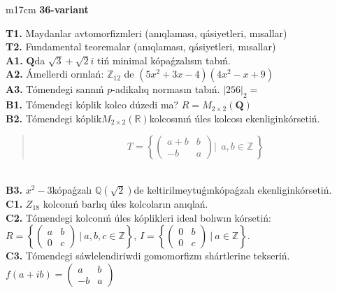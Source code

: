 \documentclass{article}
\begin{document}
\begin{tabular}{m{17cm}}
\textbf{36-variant}
\newline

\textbf{T1.} Maydanlar avtomorfizmleri (anıqlaması, qásiyetleri, mısallar) \\
\textbf{T2.} Fundamental teoremalar (anıqlaması, qásiyetleri, mısallar) \\
\textbf{A1.} \(\mathbf{Q}\)da \(\sqrt{3} + \sqrt{2}i\) tiń minimal kópaǵzalısın tabıń. \\
\textbf{A2.} Ámellerdi orınlań: \(\mathbb{Z}_{12}\) de \(\left( 5x^{2} + 3x - 4 \right)\left( 4x^{2} - x + 9 \right)\) \\
\textbf{A3.} Tómendegi sannıń \(p\)-adikalıq normasın tabıń. \(|256|_{2} =\) \\
\textbf{B1.} Tómendegi kóplik kolco dúzedi ma? \(R = M_{2 \times 2}\left( \mathbf{Q} \right)\) \\
\textbf{B2.} Tómendegi kóplik\(M_{2 \times 2}\left( \mathbb{R} \right)\)kolcosınıń úles kolcosı ekenliginkórsetiń.
\begin{quote}
\[T = \left\{ \begin{pmatrix}
a + b & b \\
 - b & a
\end{pmatrix}\left| \ \ a,b\mathbb{\in Z} \right.\  \right\}\]
\end{quote} \\
\textbf{B3.} \(x^{2} - 3\)kópaǵzalı \(\mathbb{Q}(\sqrt{2})\)de keltirilmeytuǵınkópaǵzalı ekenliginkórsetiń. \\
\textbf{C1.} \(Z_{18}\) kolconıń barlıq úles kolcoların anıqlań. \\
\textbf{C2.} Tómendegi kolconıń úles kóplikleri ideal bolıwın kórsetiń:
\(R = \left\{ \begin{pmatrix}
a & b \\
0 & c
\end{pmatrix}\ |\ a,b,c \in \mathbb{Z} \right\}\), \(I = \left\{ \begin{pmatrix}
0 & b \\
0 & c
\end{pmatrix}\ |\ a \in \mathbb{Z} \right\}\). \\
\textbf{C3.} Tómendegi sáwlelendiriwdi gomomorfizm shártlerine tekseriń. \(f(a + ib) = \begin{pmatrix}
a & b \\
 - b & a
\end{pmatrix}\) \\

\end{tabular}
\vspace{1cm}
\end{document}
